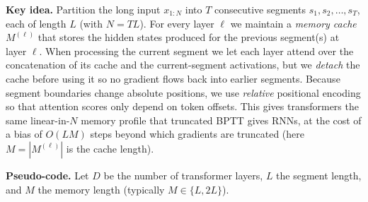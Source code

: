 \documentclass{article}
\begin{document}
{\begin{enumerate}
        \textbf{Key idea.} Partition the long input $x_{1:N}$ into $T$ consecutive segments $s_1, s_2, \ldots, s_T$, each of length $L$ (with $N = T L$). For every layer $\ell$ we maintain a \emph{memory cache} $M^{(\ell)}$ that stores the hidden states produced for the previous segment(s) at layer $\ell$. When processing the current segment we let each layer attend over the concatenation of its cache and the current-segment activations, but we \emph{detach} the cache before using it so no gradient flows back into earlier segments. Because segment boundaries change absolute positions, we use \emph{relative} positional encoding so that attention scores only depend on token offsets. This gives transformers the same linear-in-$N$ memory profile that truncated BPTT gives RNNs, at the cost of a bias of $O(L M)$ steps beyond which gradients are truncated (here $M = |M^{(\ell)}|$ is the cache length).

        \textbf{Pseudo-code.} Let $D$ be the number of transformer layers, $L$ the segment length, and $M$ the memory length (typically $M \in \{L, 2L\}$).


\end{enumerate}}
\end{document}

